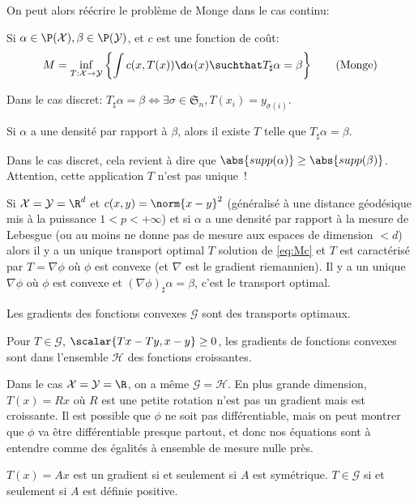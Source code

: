 On peut alors réécrire le problème de Monge dans le cas continu:
\begin{definition}
	Si $\alpha \in \P(\X), \beta \in \P(\Y)$, et $c$ est une fonction de coût:
	\begin{equation}
		M = \inf_{T : \X \to \Y} \left\{\int c(x, T(x)) \d\alpha(x)\suchthat T_{\sharp}\alpha = \beta\right\}  \tag{Monge}\label{eq:Mc}
	\end{equation}
\end{definition}

\begin{proposition}
	Dans le cas discret: $T_{\sharp}\alpha = \beta \Leftrightarrow \exists \sigma \in \mathfrak{S}_{n}, T(x_{i}) = y_{\sigma(i)}$.
\end{proposition}

\begin{thm}
	Si $\alpha$ a une densité par rapport à $\beta$, alors il existe $T$ telle que $T_{\sharp}\alpha = \beta$.
\end{thm}
\begin{remarque}
	Dans le cas discret, cela revient à dire que $\abs{supp(\alpha)} \geq \abs{supp(\beta)}$.
	Attention, cette application $T$ n'est pas unique~!
\end{remarque}

\begin{thm}[Brenier, 1991]
	Si $\X = \Y = \R^{d}$ et $c(x, y) = \norm{x - y}^{2}$
	(généralisé à une distance géodésique mis à la puissance $1 < p < +\infty$)
	et si $\alpha$ a une densité par rapport à la mesure de Lebesgue
	(ou au moins ne donne pas de mesure aux espaces de dimension $< d$) alors il y a un unique
	transport optimal $T$ solution de \eqref{eq:Mc} et $T$ est caractérisé par $T = \nabla \phi$
	où $\phi$ est convexe (et $\nabla$ est le gradient riemannien).
	Il y a un unique $\nabla \phi$ où $\phi$ est convexe et $(\nabla \phi)_{\sharp}\alpha = \beta$, c'est
	le transport optimal.
\end{thm}
\begin{corollaire}
	Les gradients des fonctions convexes $\mathcal{G}$ sont des transports optimaux.
\end{corollaire}

\begin{proposition}
	Pour $T \in \mathcal{G}$, $\scalar{Tx - Ty, x - y} \geq 0$, les gradients de fonctions convexes sont dans l'ensemble $\mathcal{H}$ des fonctions croissantes.
\end{proposition}

Dans le cas $\X = \Y = \R$, on a même $\mathcal{G} = \mathcal{H}$.
En plus grande dimension, $T(x) = Rx$ où $R$ est une petite rotation n'est pas un gradient mais est croissante.
Il est possible que $\phi$ ne soit pas différentiable, mais on peut montrer que $\phi$ va être différentiable presque partout, et donc nos équations sont à entendre comme des égalités à ensemble de mesure nulle près.
\begin{proposition}
	$T(x) = Ax$ est un gradient si et seulement si $A$ est symétrique. $T \in \mathcal{G}$ si et seulement si $A$ est définie positive.
\end{proposition}


